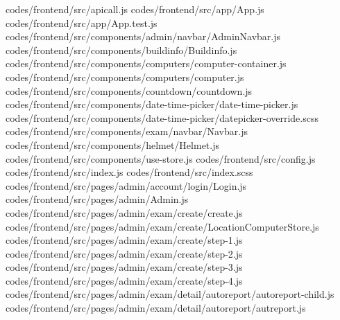 codes/frontend/src/apicall.js
codes/frontend/src/app/App.js
codes/frontend/src/app/App.test.js
codes/frontend/src/components/admin/navbar/AdminNavbar.js
codes/frontend/src/components/buildinfo/Buildinfo.js
codes/frontend/src/components/computers/computer-container.js
codes/frontend/src/components/computers/computer.js
codes/frontend/src/components/countdown/countdown.js
codes/frontend/src/components/date-time-picker/date-time-picker.js
codes/frontend/src/components/date-time-picker/datepicker-override.scss
codes/frontend/src/components/exam/navbar/Navbar.js
codes/frontend/src/components/helmet/Helmet.js
codes/frontend/src/components/use-store.js
codes/frontend/src/config.js
codes/frontend/src/index.js
codes/frontend/src/index.scss
codes/frontend/src/pages/admin/account/login/Login.js
codes/frontend/src/pages/admin/Admin.js
codes/frontend/src/pages/admin/exam/create/create.js
codes/frontend/src/pages/admin/exam/create/LocationComputerStore.js
codes/frontend/src/pages/admin/exam/create/step-1.js
codes/frontend/src/pages/admin/exam/create/step-2.js
codes/frontend/src/pages/admin/exam/create/step-3.js
codes/frontend/src/pages/admin/exam/create/step-4.js
codes/frontend/src/pages/admin/exam/detail/autoreport/autoreport-child.js
codes/frontend/src/pages/admin/exam/detail/autoreport/autreport.js
